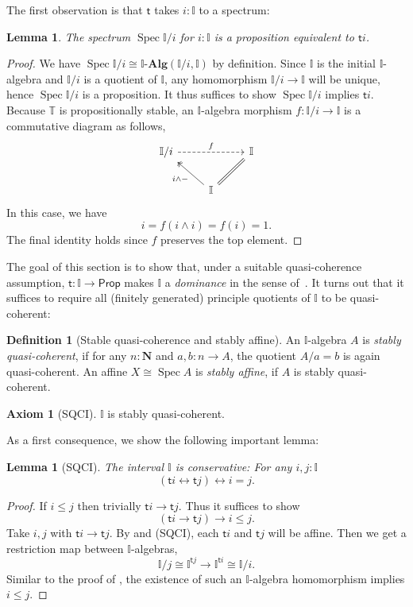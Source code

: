 \documentclass[a4paper,12pt]{amsart}
\newtheorem{lemma}[theorem]{Lemma}
\theoremstyle{definition}
\newtheorem{definition}[theorem]{Definition}
\newtheorem*{axiom}{Axiom}
\newcommand{\mb}[1]{\mathbf{#1}}
\newcommand{\mbb}[1]{\mathbb{#1}}
\newcommand{\T}{\mbb T}
\newcommand{\I}{\mbb I}
\newcommand{\ms}[1]{\mathsf{#1}}
\newcommand{\alg}{\text{-}\mb{Alg}}
\newcommand{\N}{\mb N}
\newcommand{\eq}{\leftrightarrow}
\newcommand{\pp}{\ms{Prop}}
\newcommand{\spec}{\operatorname{Spec}}
\begin{document}
The first observation is that $\ms t$ takes $i : \I$ to a spectrum:

\begin{lemma}\label{lem:openpropaffine}
  The spectrum $\spec\I/i$ for $i:\I$ is a proposition equivalent to $\ms ti$.
\end{lemma}
\begin{proof}
  We have $\spec \I/i \cong \I\alg(\I/i,\I)$ by definition. Since $\I$ is the initial $\I$-algebra and $\I/i$ is a quotient of $\I$, any homomorphism $\I/i \to \I$ will be unique, hence $\spec\I/i$ is a proposition. It thus suffices to show $\spec\I/i$ implies $\ms ti$. Because $\T$ is propositionally stable, an $\I$-algebra morphism $f \colon \I/i \to \I$ is a commutative diagram as follows,
  \[
  \begin{tikzcd}
    \I/i \ar[rr, dashed, "f"] & & \I \\ 
    & \I \ar[ul, two heads, "i \wedge -"] \ar[ur, equal]
  \end{tikzcd}
  \]
  In this case, we have
  \[ i = f(i \wedge i) = f(i) = 1. \]
  The final identity holds since $f$ preserves the top element. 
\end{proof}

The goal of this section is to show that, under a suitable quasi-coherence assumption, $\ms t \colon \I \to \pp$ makes $\I$ a \emph{dominance} in the sense of~\cite{rosolini1986continuity}. It turns out that it suffices to require all (finitely generated) principle quotients of $\I$ to be quasi-coherent:

\begin{definition}[Stable quasi-coherence and stably affine]
  An $\I$-algebra $A$ is \emph{stably quasi-coherent}, if for any $n : \N$ and $a,b \colon n \to A$, the quotient $A/a=b$ is again quasi-coherent. An affine $X \cong \spec A$ is \emph{stably affine}, if $A$ is stably quasi-coherent.
\end{definition}

\begin{axiom}[SQCI]\label{ax:sqci}
  $\I$ is stably quasi-coherent.
\end{axiom}

As a first consequence, we show the following important lemma:

\begin{lemma}[SQCI]\label{lem:intconserve}
  The interval $\I$ is \emph{conservative}: For any $i,j : \I$
  \[ (\ms ti \eq \ms tj) \eq i = j. \]
\end{lemma}
\begin{proof}
  If $i \le j$ then trivially $\ms ti \to \ms tj$. Thus it suffices to show
  \[ (\ms ti \to \ms tj) \to i \le j. \]
  Take $i,j$ with $\ms ti \to \ms tj$. By  and (SQCI), each $\ms ti$ and $\ms tj$ will be affine. Then we get a restriction map between $\I$-algebras,
  \[ \I/j \cong \I^{\ms tj} \to \I^{\ms ti} \cong \I/i. \]
  Similar to the proof of , the existence of such an $\I$-algebra homomorphism implies $i \le j$. 
\end{proof}
\end{document}

